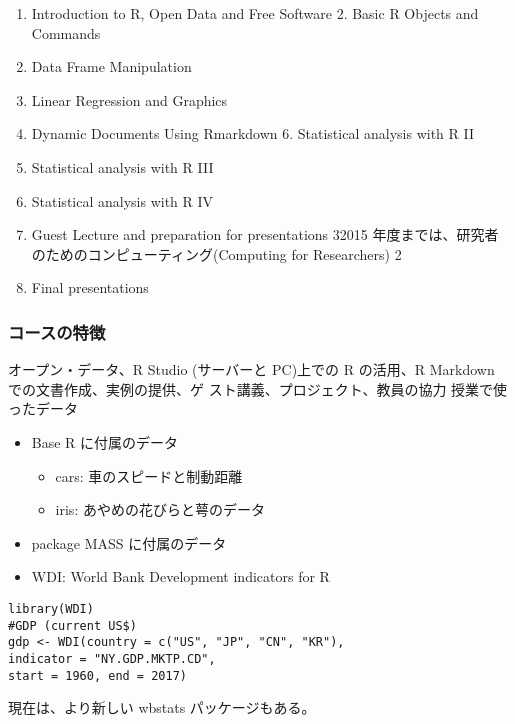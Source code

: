 \documentclass[
]{book}
\providecommand{\tightlist}{%
  \setlength{\itemsep}{0pt}\setlength{\parskip}{0pt}}
\theoremstyle{definition}
\theoremstyle{definition}
\theoremstyle{definition}
\theoremstyle{definition}
\theoremstyle{remark}
\begin{document}
\begin{enumerate}
\def\labelenumi{\arabic{enumi}.}
\item
  Introduction to R, Open Data and Free Software 2. Basic R Objects and Commands
\item
  Data Frame Manipulation
\item
  Linear Regression and Graphics
\item
  Dynamic Documents Using Rmarkdown 6. Statistical analysis with R II
\item
  Statistical analysis with R III
\item
  Statistical analysis with R IV
\item
  Guest Lecture and preparation for presentations
  32015 年度までは、研究者のためのコンピューティング(Computing for Researchers) 2
\item
  Final presentations
\end{enumerate}

\hypertarget{ux30b3ux30fcux30b9ux306eux7279ux5fb4}{%
\subsubsection{コースの特徴}\label{ux30b3ux30fcux30b9ux306eux7279ux5fb4}}

オープン・データ、R Studio (サーバーと PC)上での R の活用、R Markdown での文書作成、実例の提供、ゲ スト講義、プロジェクト、教員の協力
授業で使ったデータ

\begin{itemize}
\tightlist
\item
  Base R に付属のデータ

  \begin{itemize}
  \tightlist
  \item
    cars: 車のスピードと制動距離
  \item
    iris: あやめの花びらと萼のデータ
  \end{itemize}
\item
  package MASS に付属のデータ
\item
  WDI: World Bank Development indicators for R
\end{itemize}

\begin{verbatim}
library(WDI)
#GDP (current US$)
gdp <- WDI(country = c("US", "JP", "CN", "KR"),
indicator = "NY.GDP.MKTP.CD",
start = 1960, end = 2017)
\end{verbatim}

現在は、より新しい wbstats パッケージもある。
\end{document}
